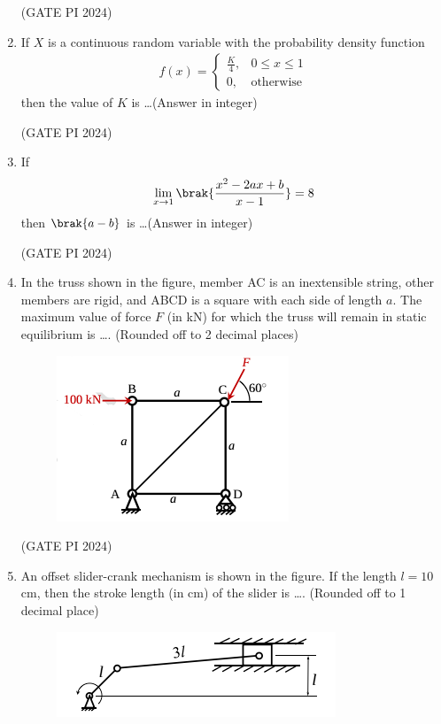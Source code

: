 \documentclass[journal,12pt,onecolumn]{IEEEtran}
\theoremstyle{remark}
\begin{document}
\begin{enumerate}
\hfill (GATE PI 2024)

\item If $X$ is a continuous random variable with the probability density function
\begin{align*}
f(x) = 
\begin{cases}
\frac{K}{4}, & 0 \leq x \leq 1 \\
0, & \text{otherwise}
\end{cases}
\end{align*}
then the value of $K$ is \dots (Answer in integer)

\hfill (GATE PI 2024)

\item If
\begin{align*}
\lim_{x \to 1} \brak{ \frac{x^2 - 2ax + b}{x-1} } = 8 
\end{align*}
then $\brak{a-b}$ is \dots (Answer in integer)

\hfill (GATE PI 2024)

\item In the truss shown in the figure, member AC is an inextensible string, other members are rigid, and ABCD is a square with each side of length $a$. The maximum value of force $F$ (in kN) for which the truss will remain in static equilibrium is \dots . (Rounded off to 2 decimal places)

\begin{figure}[H]
\centering
\includegraphics[width=0.5\columnwidth]{fig7.png}
\caption{}
\end{figure}

\hfill (GATE PI 2024)

\item An offset slider-crank mechanism is shown in the figure. If the length $l=10$ cm, then the stroke length (in cm) of the slider is \dots . (Rounded off to 1 decimal place)

\begin{figure}[H]
\centering
\includegraphics[width=0.5\columnwidth]{fig8.png}
\caption{}
\end{figure}


\end{enumerate}
\end{document}
